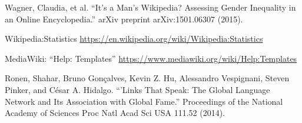 \documentclass[pre,twocolumn,twoside,superscriptaddress,floatfix, aps, 10pt]{revtex4-1}
\begin{document}
\begin{thebibliography}{1}
     Wagner, Claudia, et al. ``It's a Man's Wikipedia? Assessing Gender Inequality in an Online Encyclopedia.'' arXiv preprint arXiv:1501.06307 (2015).

     Wikipedia:Statistics 
    \url{https://en.wikipedia.org/wiki/Wikipedia:Statistics}

     MediaWiki: ``Help: Templates''
    \url{https://www.mediawiki.org/wiki/Help:Templates}

     Ronen, Shahar, Bruno Gonçalves, Kevin Z. Hu, Alessandro Vespignani, Steven Pinker, and César A. Hidalgo. ``'Links That Speak: The Global Language Network and Its Association with Global Fame.'' Proceedings of the National Academy of Sciences Proc Natl Acad Sci USA 111.52 (2014).

\end{thebibliography}
\end{document}
